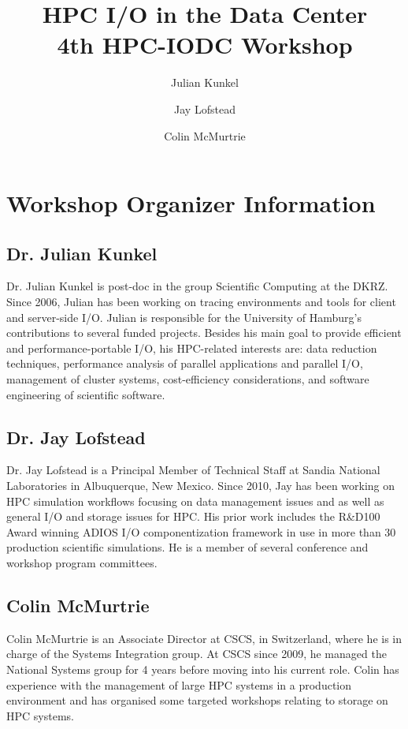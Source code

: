 \documentclass[a4paper,10pt]{article}
\title{HPC I/O in the Data Center\\ {\normalsize 4th HPC-IODC Workshop}}
\author{Julian Kunkel \and Jay Lofstead \and Colin McMurtrie}
\begin{document}
\maketitle

\section{Workshop Organizer Information}

\subsection{Dr. Julian Kunkel}

Dr. Julian Kunkel is post-doc in the group Scientific Computing at the DKRZ.
Since 2006, Julian has been working on tracing environments and tools for client and server-side I/O.
Julian is responsible for the University of Hamburg's contributions to several funded projects.
Besides his main goal to provide efficient and performance-portable I/O, his HPC-related interests are: data reduction techniques, performance analysis of parallel applications and parallel I/O, management of cluster systems, cost-efficiency considerations, and software engineering of scientific software.


\subsection{Dr. Jay Lofstead}

Dr. Jay Lofstead is a Principal Member of Technical Staff at Sandia National
Laboratories in Albuquerque, New Mexico. Since 2010, Jay has been working on
HPC simulation workflows focusing on data management issues and as well as
general I/O and storage issues for HPC.  His prior work includes the R\&D100
Award winning ADIOS I/O componentization framework in use in more than 30
production scientific simulations. He is a member of several conference and
workshop program committees.

\subsection{Colin McMurtrie}

Colin McMurtrie is an Associate Director at CSCS, in Switzerland, where he is in charge of the Systems Integration group.  At CSCS since 2009, he managed the National Systems group for 4 years before moving into his current role.  Colin has experience with the management of large HPC systems in a production environment and has organised some targeted workshops relating to storage on HPC systems.
\end{document}
